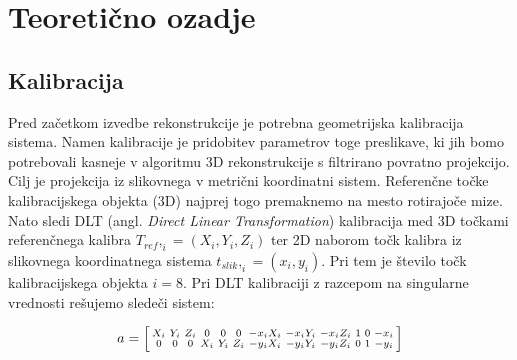 \documentclass[journal,a4paper,twoside]{sty/IEEEtran}
\begin{document}
\section{Teoretično ozadje}

\subsection{Kalibracija}

Pred začetkom izvedbe rekonstrukcije je potrebna geometrijska kalibracija sistema. Namen kalibracije je pridobitev parametrov toge preslikave, ki jih bomo potrebovali kasneje v algoritmu 3D rekonstrukcije s filtrirano povratno projekcijo. Cilj je projekcija iz slikovnega v metrični koordinatni sistem. Referenčne točke kalibracijskega objekta (3D) najprej togo premaknemo na mesto rotirajoče mize. Nato sledi DLT (angl. \textit{Direct Linear Transformation}) kalibracija med 3D točkami referenčnega kalibra $T_{ref},_i = (X_i, Y_i, Z_i)$ ter 2D naborom točk kalibra iz slikovnega koordinatnega sistema $t_{slik},_i = (x_i, y_i)$. Pri tem je število točk kalibracijskega objekta $i = 8$. Pri DLT kalibraciji z razcepom na singularne vrednosti rešujemo sledeči sistem:



\begin{equation}
\setcounter{MaxMatrixCols}{12}
a = 
\begin{bsmallmatrix}
X_i & Y_i & Z_i & 0 & 0 & 0 & -x_i X_i & -x_i Y_i & -x_i Z_i & 1 & 0 & -x_i \\ 
0 & 0 & 0 & X_i & Y_ i& Z_i & -y_i X_i & -y_i Y_i & -y_i Z_i & 0 & 1 & -y_i \\
\end{bsmallmatrix}
\end{equation}
\end{document}
